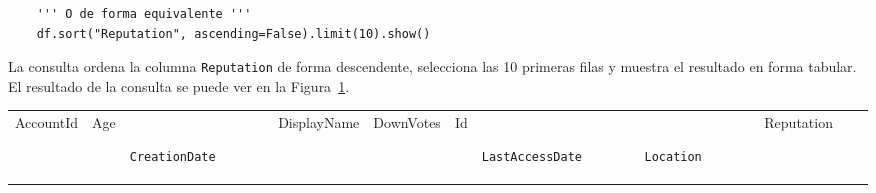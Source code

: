 \documentclass[12pt,a4paper,twoside,openright,titlepage,final]{article}
\begin{document}
\begin{enumerate}
\begin{verbatim}
	''' O de forma equivalente '''
	df.sort("Reputation", ascending=False).limit(10).show()
	\end{verbatim}
	
	La consulta ordena la columna \texttt{Reputation} de forma descendente, selecciona las 10 primeras filas y muestra el resultado en forma tabular. El resultado de la consulta se puede ver en la Figura~\ref{tbl:reputation}.
	
	\begin{longtable}[]{@{}lllllllllll@{}}
		\label{tbl:reputation}\\
		\toprule
		\begin{minipage}[t]{0.05\columnwidth}\raggedright\strut
			AccountId
			\strut\end{minipage} &
		\begin{minipage}[t]{0.03\columnwidth}\raggedright\strut
			Age
			\strut\end{minipage} &
		\begin{minipage}[t]{0.11\columnwidth}\raggedright\strut
			\begin{verbatim}
			CreationDate
			\end{verbatim}
			\strut\end{minipage} &
		\begin{minipage}[t]{0.07\columnwidth}\raggedright\strut
			DisplayName
			\strut\end{minipage} &
		\begin{minipage}[t]{0.05\columnwidth}\raggedright\strut
			DownVotes
			\strut\end{minipage} &
		\begin{minipage}[t]{0.03\columnwidth}\raggedright\strut
			Id
			\strut\end{minipage} &
		\begin{minipage}[t]{0.11\columnwidth}\raggedright\strut
			\begin{verbatim}
			LastAccessDate
			\end{verbatim}
			\strut\end{minipage} &
		\begin{minipage}[t]{0.11\columnwidth}\raggedright\strut
			\begin{verbatim}
			Location
			\end{verbatim}
			\strut\end{minipage} &
		\begin{minipage}[t]{0.06\columnwidth}\raggedright\strut
			Reputation
			\strut\end{minipage} &
		\begin{minipage}[t]{0.04\columnwidth}\raggedright\strut

\end{minipage}
\end{longtable}
\end{enumerate}
\end{document}
